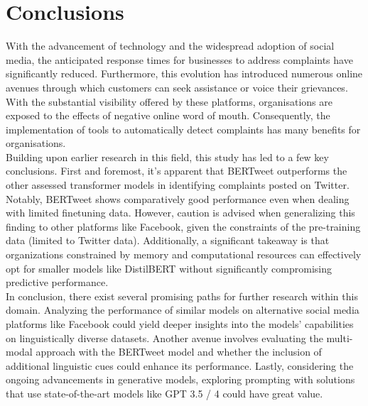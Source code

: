 \chapter{Conclusions}

With the advancement of technology and the widespread adoption of social media, the anticipated response times for businesses to address complaints have significantly reduced. Furthermore, this evolution has introduced numerous online avenues through which customers can seek assistance or voice their grievances. With the substantial visibility offered by these platforms, organisations are exposed to the effects of negative online word of mouth. Consequently, the implementation of tools to automatically detect complaints has many benefits for organisations.\\

Building upon earlier research in this field, this study has led to a few key conclusions. First and foremost, it's apparent that BERTweet outperforms the other assessed transformer models in identifying complaints posted on Twitter. Notably, BERTweet shows comparatively good performance even when dealing with limited finetuning data. However, caution is advised when generalizing this finding to other platforms like Facebook, given the constraints of the pre-training data (limited to Twitter data). Additionally, a significant takeaway is that organizations constrained by memory and computational resources can effectively opt for smaller models like DistilBERT without significantly compromising predictive performance.\\

In conclusion, there exist several promising paths for further research within this domain. Analyzing the performance of similar models on alternative social media platforms like Facebook could yield deeper insights into the models' capabilities on linguistically diverse datasets. Another avenue involves evaluating the multi-modal approach with the BERTweet model and whether the inclusion of additional linguistic cues could enhance its performance. Lastly, considering the ongoing advancements in generative models, exploring prompting with solutions that use state-of-the-art models like GPT 3.5 / 4 could have great value.
